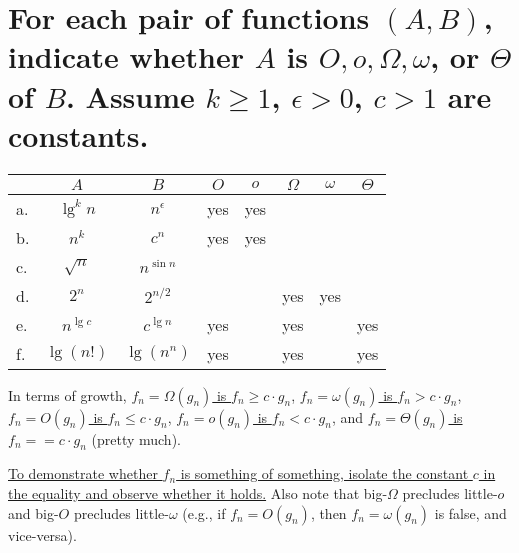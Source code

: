 \section[Problem 5]{For each pair of functions $(A, B)$, indicate whether $A$ is $O, o, \Omega, \omega$, or $\Theta$ of $B$. Assume $k \geq 1$, $\epsilon > 0$, $c > 1$ are constants.}

\begin{center}
	\begin{tabular}{lcc|c|c|c|c|c}
		& $A$ & $B$ & $O$ & $o$ & $\Omega$ & $\omega$ & $\Theta$ \\ \hline
		a. & $\lg^k n$ & $n^{\epsilon}$ & yes & yes &  &  &  \\ \hline
		b. & $n^k$ & $c^n$				& yes & yes &  &  &  \\ \hline
		c. & $\sqrt{n}$ & $n^{\sin n}$	&  &  &  &  &  \\ \hline
		d. & $2^n$ & $2^{n/2}$			&  &  & yes & yes &  \\ \hline
		e. & $n^{\lg c}$ & $c^{\lg n}$	& yes &  & yes &  & yes \\ \hline
		f. & $\lg(n!)$ & $\lg(n^n)$		& yes &  & yes &  & yes 
	\end{tabular}
\end{center}

\noindent
In terms of growth,
\ul{$f_n = \Omega(g_n)$ is	$f_n \geq c \cdot g_n$},
\ul{$f_n = \omega(g_n)$ is	$f_n > c \cdot g_n$},
\ul{$f_n = O(g_n)$ is		$f_n \leq c \cdot g_n$},
\ul{$f_n = o(g_n)$ is		$f_n < c \cdot g_n$}, and
\ul{$f_n = \Theta(g_n)$ is	$f_n == c \cdot g_n$} (pretty much).

\ul{To demonstrate whether $f_n$ is something of something, isolate the constant $c$ in the equality and observe whether it holds.} Also note that big-$\Omega$ precludes little-$o$ and big-$O$ precludes little-$\omega$ (e.g., if $f_n = O(g_n)$, then $f_n = \omega(g_n)$ is false, and vice-versa).
